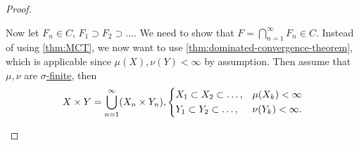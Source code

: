 \begin{proof}
\begin{enumerate}
		      \par Now let \(F_{n} \in C\), \(F_1\supset F_2\supset \ldots  \). We need to show that \(F = \bigcap\limits_{n=1}^{\infty} F_{n} \in C\).
		      Instead of using \autoref{thm:MCT}, we now want to use \autoref{thm:dominated-convergence-theorem}, which is applicable since \(\mu (X), \nu (Y)< \infty \)
		      by assumption. Then assume that \(\mu , \nu \) are \hyperref[def:finite-measure]{\(\sigma \)-finite}, then
		      \[
			      X\times Y = \bigcup\limits_{n=1}^{\infty} (X_{n} \times Y_{n} ), \begin{dcases}
				      X_1\subset X_2\subset \ldots , & \mu (X_{k} )< \infty   \\
				      Y_1\subset Y_2\subset \ldots , & \nu (Y_{k} )< \infty .
			      \end{dcases}
		      \]
	\end{enumerate}
\end{proof}

